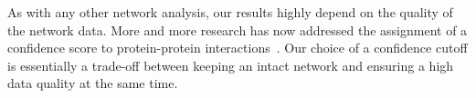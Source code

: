 As with any other network analysis, our results highly depend on the quality of
the network data. More and more research has now addressed the assignment of
a confidence score to protein-protein interactions~\citep{Kamburov2012}.
Our choice of a confidence cutoff is essentially a trade-off between keeping
an intact network and ensuring a high data quality at the same time.













